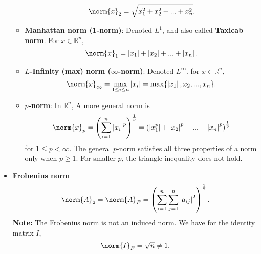 \documentclass{report}
\begin{document}
\begin{itemize}
\begin{itemize}
                    \begin{align*}
                        \norm{x}_{2} = \sqrt{x_{1}^{2} + x_{2}^{2} + ... + x_{n}^{2}}
                    .\end{align*}
                \item \textbf{Manhattan norm (1-norm)}: Denoted $L^{1} $, and also called \textbf{Taxicab norm}. For $x \in \mathbb{R}^{n} $,
                    \begin{align*}
                        \norm{x}_{1} = \left\lvert x_{1} \right\rvert + \left\lvert x_{2} \right\rvert + ... + \left\lvert x_{n} \right\rvert
                    .\end{align*}
                \item \textbf{$L$-Infinity (max) norm ($\infty$-norm)}: Denoted $L^{\infty}$. for $x\in \mathbb{R}^{n}$,
                    \begin{align*}
                        \norm{x}_{\infty} = \max_{1 \leq i \leq n} \left\lvert x_{i} \right\rvert = \max\{\left\lvert x_{1} \right\rvert, x_{2}, ..., x_{n}\} 
                    .\end{align*}
                \item \textbf{$p$-norm}: In $\mathbb{R}^{n}$, A more general norm is
                    \begin{align*}
                        \norm{x}_{p} = \left(\sum_{i=1}^{n} \left\lvert x_{i} \right\rvert^{p}\right)^{\frac{1}{p}} = \left(\left\lvert x_{1}^{p} \right\rvert + \left\lvert x_{2} \right\rvert^{p} + ... + \left\lvert x_{n} \right\rvert^{p}\right)^{\frac{1}{p}}
                    \end{align*}
                    for $1 \leq p < \infty $. The general $p$-norm satisfies all three properties of a norm only when $p \geq 1$. For smaller $p$, the triangle inequality does not hold.
            \end{itemize}
        \item \textbf{Frobenius norm}
            \begin{align*}
                \norm{A}_{2} = \norm{A}_{F} = \left(\sum_{i=1}^{n}\sum_{j=1}^{n}\left\lvert a_{ij} \right\rvert^{2}\right)^{\frac{1}{2}}
            .\end{align*}
            \bigbreak \noindent 
            \textbf{Note:} The Frobenius norm is not an induced norm. We have for the identity matrix $I$,
            \begin{align*}
                \norm{I}_{F} = \sqrt{n} \ne 1    
            .\end{align*}

\end{itemize}
\end{document}
